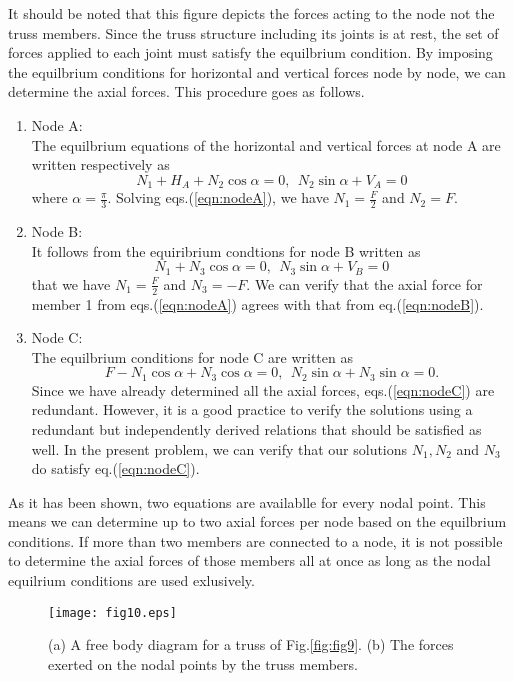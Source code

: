 \documentclass[10pt,a4j]{article}
\begin{document}
It should be noted that this figure depicts the forces acting to the node not the truss members.  
Since the truss structure including its joints is at rest, the set of forces 
applied to each joint must satisfy the equilbrium condition.
By imposing the equilbrium conditions for horizontal and vertical forces node by node, 
we can determine the axial forces. This procedure goes as follows.
\begin{enumerate}
\item
	Node A: \\
	The equilbrium equations of the horizontal and vertical forces at node A 
	are written respectively as 
	\begin{equation}
		N_1+H_A+N_2\cos\alpha=0, \ \ N_2\sin\alpha+V_A=0
		\label{eqn:nodeA}
	\end{equation}
	where $\alpha=\frac{\pi}{3}$. Solving eqs.(\ref{eqn:nodeA}), 
	we have $N_1=\frac{F}{2}$ and $N_2=F$. 
\item
	Node B: \\
	It follows from the equiribrium condtions for node B written as 
	\begin{equation}
		N_1+N_3\cos\alpha=0, \ \ N_3\sin\alpha+V_B=0
		\label{eqn:nodeB}
	\end{equation}
	that we have $N_1=\frac{F}{2}$ and $N_3=-F$.
	We can verify that the axial force for member 1 from eqs.(\ref{eqn:nodeA}) 
	agrees with that from eq.(\ref{eqn:nodeB}).
\item
	Node C: \\
	The equilbrium conditions for node C are written as 
	\begin{equation}
		F-N_1\cos\alpha+N_3\cos\alpha=0, \ \ N_2\sin\alpha+N_3\sin\alpha=0.
		\label{eqn:nodeC}
	\end{equation}
	Since we have already determined all the axial forces, 
	eqs.(\ref{eqn:nodeC}) are redundant.  
	However, it is a good practice to verify the solutions using a redundant 
	but independently derived relations that should be satisfied as well.  
	In the present problem, we can verify that our solutions $N_1,N_2$ and $N_3$ do 
	satisfy eq.(\ref{eqn:nodeC}).
\end{enumerate}
As it has been shown, two equations are availablle for every nodal point.
This means we can determine up to two axial forces per node 
based on the  equilbrium conditions. 
If more than two members are connected to a node, it is not possible to 
determine the axial forces of those members all at once as long as 
the nodal equilrium conditions are used exlusively.
\begin{figure}[h]
	\begin{center}
	\texttt{[image: fig10.eps]} 
	\end{center}
	\caption{(a) A free body diagram for a truss of Fig.\ref{fig:fig9}. 
	(b) The forces exerted on the nodal points by the truss members.} 
	\label{fig:fig10}
\end{figure}
\end{document}
